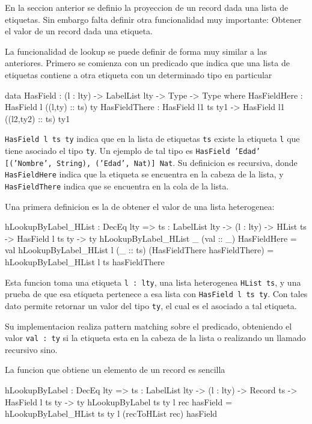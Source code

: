 En la seccion anterior se definio la proyeccion de un record dada una lista de etiquetas. Sin embargo falta definir otra funcionalidad muy importante: Obtener el valor de un record dada una etiqueta.

La funcionalidad de lookup se puede definir de forma muy similar a las anteriores. Primero se comienza con un predicado que indica que una lista de etiquetas contiene a otra etiqueta con un determinado tipo en particular

\begin{code}
data HasField : (l : lty) -> LabelList lty -> 
  Type -> Type where
  HasFieldHere : HasField l ((l,ty) :: ts) ty
  HasFieldThere : HasField l1 ts ty1 -> 
    HasField l1 ((l2,ty2) :: ts) ty1
\end{code}

\texttt{HasField l ts ty} indica que en la lista de etiquetas \texttt{ts} existe la etiqueta \texttt{l} que tiene asociado el tipo \texttt{ty}. Un ejemplo de tal tipo es \texttt{HasField 'Edad' [('Nombre', String), ('Edad', Nat)] Nat}. Su definicion es recursiva, donde \texttt{HasFieldHere} indica que la etiqueta se encuentra en la cabeza de la lista, y \texttt{HasFieldThere} indica que se encuentra en la cola de la lista.

Una primera definicion es la de obtener el valor de una lista heterogenea:

\begin{code}
hLookupByLabel_HList : DecEq lty => {ts : LabelList lty} -> 
  (l : lty) -> HList ts -> HasField l ts ty -> ty
hLookupByLabel_HList _ (val :: _) HasFieldHere = val
hLookupByLabel_HList l (_ :: ts) 
  (HasFieldThere hasFieldThere) = 
  hLookupByLabel_HList l ts hasFieldThere
\end{code}

Esta funcion toma una etiqueta \texttt{l : lty}, una lista heterogenea \texttt{HList ts}, y una prueba de que esa etiqueta pertenece a esa lista con \texttt{HasField l ts ty}. Con tales dato permite retornar un valor del tipo \texttt{ty}, el cual es el asociado a tal etiqueta.

Su implementacion realiza pattern matching sobre el predicado, obteniendo el valor \texttt{val : ty} si la etiqueta esta en la cabeza de la lista o realizando un llamado recursivo sino.

La funcion que obtiene un elemento de un record es sencilla

\begin{code}
hLookupByLabel : DecEq lty => {ts : LabelList lty} -> 
  (l : lty) -> Record ts -> HasField l ts ty -> ty
hLookupByLabel {ts} {ty} l rec hasField = 
  hLookupByLabel_HList {ts} {ty} l (recToHList rec) hasField
\end{code}

